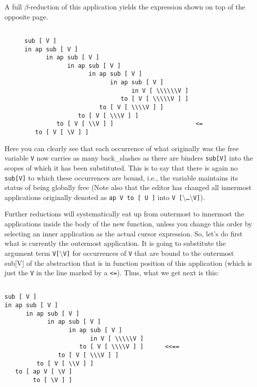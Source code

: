 A full $\beta$-reduction of this application yields the expression
 shown on top of the opposite page.
\begin{figure}
\begin{verbatim}

sub [ V ]
in ap sub [ V ]
      in ap sub [ V ]
            in ap sub [ V ]
                  in ap sub [ V ]
                        in ap sub [ V ]
                              in V [ \\\\\\V ]
                           to [ V [ \\\\\V ] ]
                     to [ V [ \\\\V ] ]
               to [ V [ \\\V ] ]
         to [ V [ \\V ] ]                       <=
   to [ V [ \V ] ]

\end{verbatim}
\end{figure}
Here you can clearly see that each occurrence of what originally was the
free variable {\tt V} now carries as many back\_slashes as there are
binders {\tt sub[V]} into the scopes of which it has been substituted. This is to say
that there is again no {\tt sub[V]} to which these occurrences are bound,
i.e., the variable maintains its status of being globally free (Note also
that the editor has changed all innermost applications originally 
denoted as {\tt ap V to [ U ]} into {\tt V [$\setminus$\ldots$\setminus$V]}).

Further reductions will systematically eat up from outermost to innermost
the applications inside the body of the new function, unless you change 
this order by selecting an inner application as the actual 
cursor expression. So, let's do first  what is currently 
the outermost application. It
is going to substitute the argument term {\tt V[$\setminus$V]} for  
occurrences of {\tt V} that are bound to the outermost sub[V] of
 the abstraction that is in function position of this application
(which is just the {\tt V} in the line marked by a {\tt <=}). Thus,
what we get next is this:
\begin{verbatim}

sub [ V ]
in ap sub [ V ]
      in ap sub [ V ]
            in ap sub [ V ]
                  in ap sub [ V ]
                        in V [ \\\\\V ]
                     to [ V [ \\\\V ] ]      <<==
               to [ V [ \\\V ] ]
         to [ V [ \\V ] ]
   to [ ap V [ \V ]
        to [ \V ] ]

\end{verbatim}

